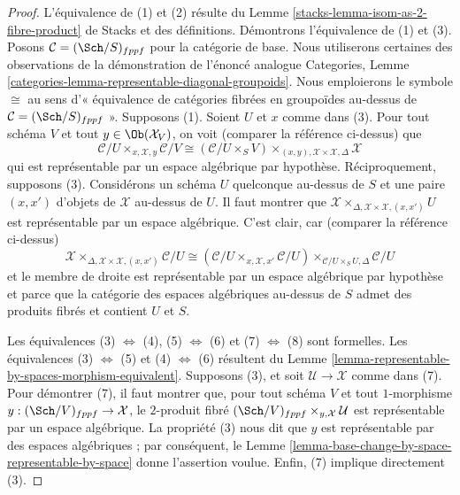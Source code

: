 \begin{proof}
L'équivalence de (1) et (2) résulte du
Lemme \ref{stacks-lemma-isom-as-2-fibre-product} de Stacks
et des définitions.
Démontrons l'équivalence de (1) et (3).
Posons $\mathcal{C} = (\Sch/S)_{fppf}$ pour la catégorie de base.
Nous utiliserons certaines des observations de la démonstration de l'énoncé analogue
Categories, Lemme \ref{categories-lemma-representable-diagonal-groupoids}.
Nous emploierons le symbole $\cong$ au sens d'« équivalence de catégories fibrées
en groupoïdes au-dessus de $\mathcal{C} = (\Sch/S)_{fppf}$ ».
Supposons (1). Soient $U$ et $x$ comme dans (3). Pour tout schéma $V$
et tout $y \in \Ob(\mathcal{X}_V)$, on voit (comparer la référence ci-dessus) que
$$
\mathcal{C}/U
\times_{x, \mathcal{X}, y}
\mathcal{C}/V
\cong
(\mathcal{C}/U \times_S V)
\times_{(x, y), \mathcal{X} \times \mathcal{X}, \Delta}
\mathcal{X}
$$
qui est représentable par un espace algébrique par hypothèse. Réciproquement,
supposons (3). Considérons un schéma $U$ quelconque au-dessus de $S$ et une paire $(x, x')$
d'objets de $\mathcal{X}$ au-dessus de $U$. Il faut montrer que
$\mathcal{X} \times_{\Delta, \mathcal{X} \times \mathcal{X}, (x, x')} U$
est représentable par un espace algébrique. C'est clair, car
(comparer la référence ci-dessus)
$$
\mathcal{X}
\times_{\Delta, \mathcal{X} \times \mathcal{X}, (x, x')}
\mathcal{C}/U
\cong
(\mathcal{C}/U \times_{x, \mathcal{X}, x'} \mathcal{C}/U)
\times_{\mathcal{C}/U \times_S U, \Delta}
\mathcal{C}/U
$$
et le membre de droite est représentable par un espace algébrique par hypothèse
et parce que la catégorie des espaces algébriques au-dessus de $S$ admet des produits fibrés
et contient $U$ et $S$.

\medskip\noindent
Les équivalences
(3) $\Leftrightarrow$ (4),
(5) $\Leftrightarrow$ (6)
et
(7) $\Leftrightarrow$ (8)
sont formelles. Les équivalences
(3) $\Leftrightarrow$ (5) et
(4) $\Leftrightarrow$ (6)
résultent du
Lemme \ref{lemma-representable-by-spaces-morphism-equivalent}.
Supposons (3), et soit $\mathcal{U} \to \mathcal{X}$ comme dans (7).
Pour démontrer (7), il faut montrer que, pour tout schéma $V$ et tout $1$-morphisme
$y : (\Sch/V)_{fppf} \to \mathcal{X}$, le $2$-produit fibré
$(\Sch/V)_{fppf} \times_{y, \mathcal{X}} \mathcal{U}$
est représentable par un espace algébrique. La propriété (3) nous dit
que $y$ est représentable par des espaces algébriques ; par conséquent, le
Lemme \ref{lemma-base-change-by-space-representable-by-space}
donne l'assertion voulue. Enfin, (7) implique directement (3).
\end{proof}

